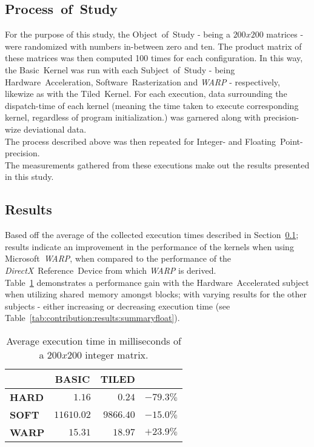 \documentclass[fleqn,10pt]{SelfArx} %
\begin{document}
\subsection{Process~of~Study}
\label{sec:contribution:processofstudy}
For the purpose of this study, the Object~of~Study - being a $200x200$ matrices - were randomized with numbers in-between zero and ten. The product matrix of these matrices was then computed 100 times for each configuration. In this way, the Basic~Kernel was run with each Subject~of~Study - being Hardware~Acceleration, Software~Rasterization and \textit{WARP} - respectively, likewize as with the Tiled~Kernel. For each execution, data surrounding the dispatch-time of each kernel (meaning the time taken to execute corresponding kernel, regardless of program initialization.) was garnered along with precision-wize deviational data.\\
The process described above was then repeated for Integer- and Floating~Point-precision.\\

\noindent
The measurements gathered from these executions make out the results presented in this study.

\subsection{Results}
\label{sec:contribution:results}
Based off the average of the collected execution times described in Section~\ref{sec:contribution:processofstudy}; results indicate an improvement in the performance of the kernels when using Microsoft~\textit{WARP}, when compared to the performance of the \textit{DirectX}~Reference~Device from which \textit{WARP} is derived.\\
Table~\ref{tab:contribution:results:summaryint} demonstrates a performance gain with the Hardware~Accelerated subject when utilizing shared~memory amongst blocks; with varying results for the other subjects - either increasing or decreasing execution time (see Table~\ref{tab:contribution:results:summaryfloat}).

\begin{table}[hbt]
\begin{center}
\begin{tabular}{r|r|r|r|}
	\cline{2-3}
							& \multicolumn{1}{|c|}{\textbf{BASIC}} & \multicolumn{1}{|c|}{\textbf{TILED}}	\\ \hline
	\multicolumn{1}{|l|}{\textbf{HARD}}	& $1.16$			& $0.24$ 	& $-79.3\%$    					\\ \hline
	\multicolumn{1}{|l|}{\textbf{SOFT}}	& $11610.02$		& $9866.40$	& $-15.0\%$     					\\ \hline
	\multicolumn{1}{|l|}{\textbf{WARP}}	& $15.31$			& $18.97$	& $+23.9\%$     					\\ \hline
\end{tabular}
\end{center}
\label{tab:contribution:results:summaryint}
\caption{Average execution time in milliseconds of a $200x200$ integer matrix.}
\end{table}
\end{document}
